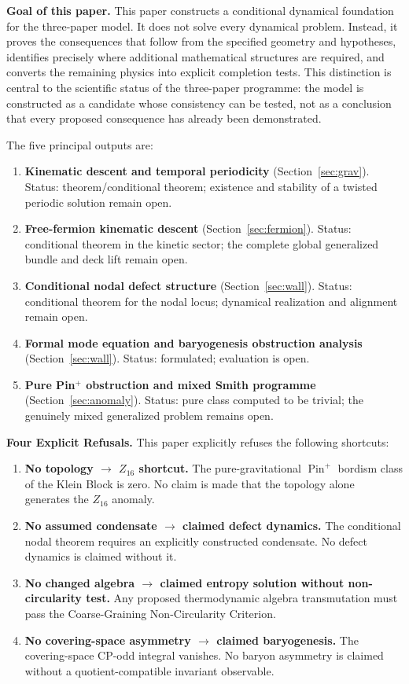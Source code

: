 \documentclass[11pt]{article}
\theoremstyle{canonmath}
\theoremstyle{canonpostulate}
\theoremstyle{canonclaim}
\providecommand{\Pin}{\operatorname{Pin}}
\def\mathbb#1{#1}%
\begin{document}
\textbf{Goal of this paper.} This paper constructs a conditional dynamical foundation for the three-paper model. It does not solve every dynamical problem. Instead, it proves the consequences that follow from the specified geometry and hypotheses, identifies precisely where additional mathematical structures are required, and converts the remaining physics into explicit completion tests. This distinction is central to the scientific status of the three-paper programme: the model is constructed as a candidate whose consistency can be tested, not as a conclusion that every proposed consequence has already been demonstrated.

The five principal outputs are:

\begin{enumerate}
\item \textbf{Kinematic descent and temporal periodicity} (Section~\ref{sec:grav}). Status: theorem/conditional theorem; existence and stability of a twisted periodic solution remain open.
\item \textbf{Free-fermion kinematic descent} (Section~\ref{sec:fermion}). Status: conditional theorem in the kinetic sector; the complete global generalized bundle and deck lift remain open.
\item \textbf{Conditional nodal defect structure} (Section~\ref{sec:wall}). Status: conditional theorem for the nodal locus; dynamical realization and alignment remain open.
\item \textbf{Formal mode equation and baryogenesis obstruction analysis} (Section~\ref{sec:wall}). Status: formulated; evaluation is open.
\item \textbf{Pure Pin$^+$ obstruction and mixed Smith programme} (Section~\ref{sec:anomaly}). Status: pure class computed to be trivial; the genuinely mixed generalized problem remains open.
\end{enumerate}

\newpage
\begin{keyresult}
\textbf{Four Explicit Refusals.} This paper explicitly refuses the following shortcuts:
\begin{enumerate}
\item \textbf{No topology $\to$ $\mathbb{Z}_{16}$ shortcut.} The pure-gravitational $\Pin^+$ bordism class of the Klein Block is zero. No claim is made that the topology alone generates the $\mathbb{Z}_{16}$ anomaly.
\item \textbf{No assumed condensate $\to$ claimed defect dynamics.} The conditional nodal theorem requires an explicitly constructed condensate. No defect dynamics is claimed without it.
\item \textbf{No changed algebra $\to$ claimed entropy solution without non-circularity test.} Any proposed thermodynamic algebra transmutation must pass the Coarse-Graining Non-Circularity Criterion.
\item \textbf{No covering-space asymmetry $\to$ claimed baryogenesis.} The covering-space CP-odd integral vanishes. No baryon asymmetry is claimed without a quotient-compatible invariant observable.
\end{enumerate}
\end{keyresult}
\end{document}
